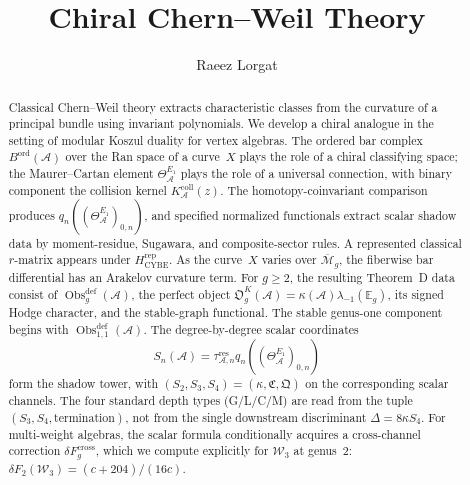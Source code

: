 \documentclass[11pt,reqno]{amsart}
\theoremstyle{definition}
\theoremstyle{remark}
\newcommand{\cA}{\mathcal{A}}
\newcommand{\cW}{\mathcal{W}}
\newcommand{\Mbar}{\overline{\mathcal{M}}}
\newcommand{\Eone}{E_1}
\numberwithin{equation}{section}
\begin{document}
\title[Chiral Chern--Weil Theory]
{Chiral Chern--Weil Theory}

\author{Raeez Lorgat}
\address{Perimeter Institute for Theoretical Physics,
 Waterloo, ON N2L 2Y5, Canada}

\date{}

\begin{abstract}
Classical Chern--Weil theory extracts characteristic classes from
the curvature of a principal bundle using invariant polynomials.
We develop a chiral analogue in the setting of modular Koszul
duality for vertex algebras. The ordered bar complex
$B^{\mathrm{ord}}(\cA)$ over the Ran space of a curve~$X$
plays the role of a chiral classifying space; the Maurer--Cartan
element $\Theta_\cA^{\Eone}$ plays the role of a universal
connection, with binary component the collision kernel
$K_\cA^{\mathrm{coll}}(z)$.  The homotopy-coinvariant comparison
produces $q_n((\Theta_\cA^{\Eone})_{0,n})$, and specified normalized
functionals extract scalar shadow data by moment-residue, Sugawara,
and composite-sector rules.  A represented classical $r$-matrix
appears under $H_{\mathrm{CYBE}}^{\mathrm{rep}}$. As the curve~$X$
varies over $\Mbar_g$, the fiberwise bar differential has an Arakelov
curvature term.  For $g\geq2$, the resulting Theorem~D data consist
of $\operatorname{Obs}^{\mathrm{def}}_g(\cA)$, the perfect object
$\mathfrak O_g^K(\cA)=\kappa(\cA)\lambda_{-1}(\mathbb E_g)$, its
signed Hodge character, and the stable-graph functional.
The stable genus-one component begins with
$\operatorname{Obs}^{\mathrm{def}}_{1,1}(\cA)$.
The degree-by-degree scalar coordinates
\[
S_n(\cA)=\tau_{\cA,n}^{\mathrm{res}}
q_n((\Theta_\cA^{E_1})_{0,n})
\]
form the shadow tower, with
$(S_2,S_3,S_4)=(\kappa,\mathfrak C,\mathfrak Q)$ on the corresponding
scalar channels. The four standard depth types (G/L/C/M) are
read from the tuple $(S_3,S_4,\text{termination})$, not from the
single downstream discriminant $\Delta=8\kappa S_4$.
For multi-weight algebras, the scalar formula conditionally acquires a
cross-channel correction
$\delta F_g^{\mathrm{cross}}$, which we compute explicitly
for $\cW_3$ at genus~$2$:
$\delta F_2(\cW_3) = (c{+}204)/(16c)$.
\end{abstract}



\maketitle
\end{document}
